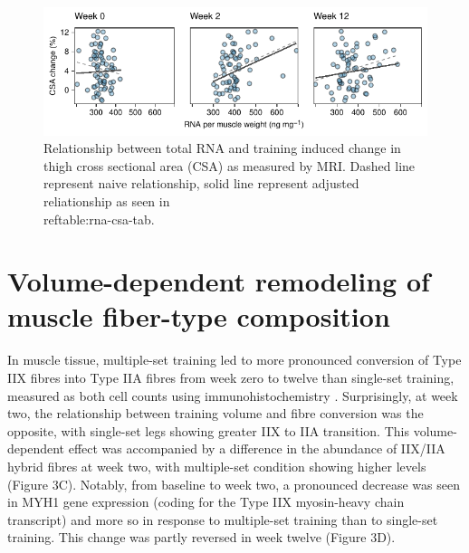 \documentclass[twoside,10pt]{gihclass} %
\begin{document}
\begin{figure}

{\centering \includegraphics{thesis_files/figure-latex/rrna-csa-fig-1} 

}

\caption[Relationship between total RNA and training induced muscle growth]{Relationship between total RNA and training induced change in thigh cross sectional area (CSA) as measured by MRI. Dashed line represent naive relationship, solid line represent adjusted reliationship as seen in \\ref{table:rna-csa-tab}.}\label{fig:rrna-csa-fig}
\end{figure}
\hypertarget{volume-dependent-remodeling-of-muscle-fiber-type-composition}{%
\section{Volume-dependent remodeling of muscle fiber-type composition}\label{volume-dependent-remodeling-of-muscle-fiber-type-composition}}

In muscle tissue, multiple-set training led to more pronounced conversion of Type IIX fibres into Type IIA fibres from week zero to twelve than single-set training, measured as both cell counts using immunohistochemistry . Surprisingly, at week two, the relationship between training volume and fibre conversion was the opposite, with single-set legs showing greater IIX to IIA transition. This volume-dependent effect was accompanied by a difference in the abundance of IIX/IIA hybrid fibres at week two, with multiple-set condition showing higher levels (Figure 3C). Notably, from baseline to week two, a pronounced decrease was seen in MYH1 gene expression (coding for the Type IIX myosin-heavy chain transcript) and more so in response to multiple-set training than to single-set training. This change was partly reversed in week twelve (Figure 3D).
\end{document}
